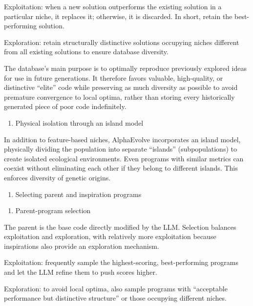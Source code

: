 Exploitation: when a new solution outperforms the existing solution in a particular niche, it replaces it; otherwise, it is discarded. In short, retain the best-performing solution.

Exploration: retain structurally distinctive solutions occupying niches different from all existing solutions to ensure database diversity.

The database's main purpose is to optimally reproduce previously explored ideas for use in future generations. It therefore favors valuable, high-quality, or distinctive ``elite'' code while preserving as much diversity as possible to avoid premature convergence to local optima, rather than storing every historically generated piece of poor code indefinitely.

\begin{enumerate}
\def\labelenumi{\arabic{enumi}.}
\setcounter{enumi}{2}
\tightlist
\item
  Physical isolation through an island model
\end{enumerate}

In addition to feature-based niches, AlphaEvolve incorporates an island model, physically dividing the population into separate ``islands'' (subpopulations) to create isolated ecological environments. Even programs with similar metrics can coexist without eliminating each other if they belong to different islands. This enforces diversity of genetic origins.

\begin{enumerate}
\def\labelenumi{(\Roman{enumi})}
\setcounter{enumi}{3}
\tightlist
\item
  Selecting parent and inspiration programs
\end{enumerate}

\begin{enumerate}
\def\labelenumi{\arabic{enumi}.}
\tightlist
\item
  Parent-program selection
\end{enumerate}

The parent is the base code directly modified by the LLM. Selection balances exploitation and exploration, with relatively more exploitation because inspirations also provide an exploration mechanism.

Exploitation: frequently sample the highest-scoring, best-performing programs and let the LLM refine them to push scores higher.

Exploration: to avoid local optima, also sample programs with ``acceptable performance but distinctive structure'' or those occupying different niches.

